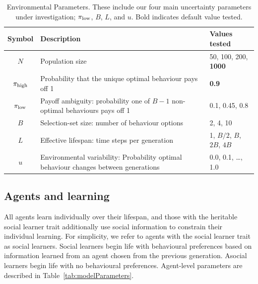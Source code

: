 \documentclass[letterpaper,11.5pt]{scrartcl}
\begin{document}
\vspace{2em}
\begin{table}[h]
\caption{Environmental Parameters. These include our four main uncertainty parameters under investigation; 
$\pi_{\mathrm{low}}$, $B$, $L$, and $u$. Bold indicates default value tested.} %
    \label{tab:uncertaintyParameters}
    \centering %
    \begin{tabular}{cp{4.0in}p{1.25in}} \toprule

        Symbol & Description & Values tested \\ 

        \midrule  
        $N$    & Population size
                 & 50, 100, 200, \textbf{1000} \\
               

        $\pi_{\mathrm{high}}$ & Probability that the unique optimal behaviour pays off 1 
                & \textbf{0.9} \\

        $\pi_{\mathrm{low}}$ & Payoff ambiguity: probability one of $B - 1$ non-optimal behaviours pays off 1
                 & 0.1, 0.45, 0.8 \\ 

        $B$       & Selection-set size: number of behaviour options
                  & 2, 4, 10 \\
                  
        $L$    & Effective lifespan: time steps per generation & 1, $B/2$, $B$, $2B$, $4B$ \\
        
        $u$    & Environmental variability: Probability optimal behaviour changes between generations
               & 0.0, 0.1, \ldots, 1.0 \\
               
        \bottomrule
        \end{tabular} 
\end{table}



\subsection{Agents and learning}

All agents learn individually over their lifespan, and those with
the heritable social learner trait additionally use social information to constrain their individual
learning. For simplicity, we refer to agents with the social learner trait 
as social learners. 
Social learners begin life with behavioural preferences based on information learned from an agent chosen from the previous generation. Asocial learners begin life with no behavioural preferences. Agent-level parameters are described in Table~\ref{tab:modelParameters}. 
\end{document}
